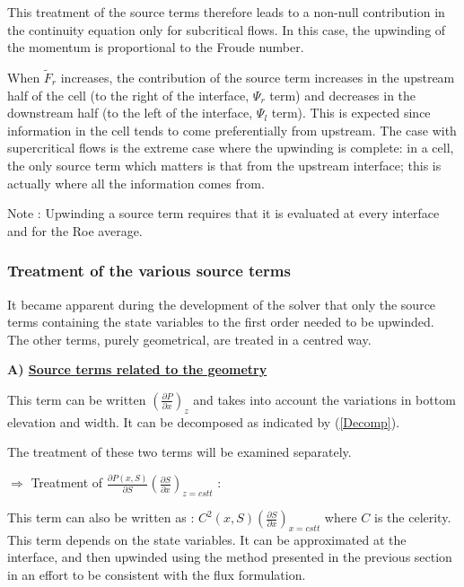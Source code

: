 This treatment of the source terms therefore leads to a non-null contribution in the continuity equation only for subcritical flows. In this case, the upwinding of the momentum is proportional to the Froude number.

When $\tilde{F}_r$ increases, the contribution of the source term increases in the upstream half of the cell (to the right of the interface, $\Psi_r$ term) and decreases in the downstream half (to the left of the interface, $\Psi_l$ term). This is expected since information in the cell tends to come preferentially from upstream. The case with supercritical flows is the extreme case where the upwinding is complete: in a cell, the only source term which matters is that from the upstream interface; this is actually where all the information comes from.

\begin{CommentBlock}{Note :}
Upwinding a source term requires that it is evaluated at every interface and for the Roe average.
\end{CommentBlock}

\subsubsection{Treatment of the various source terms}

It became apparent during the development of the solver that only the source terms containing the state variables to the first order needed to be upwinded. The other terms, purely geometrical, are treated in a centred way.

\textbf{A) \underline{Source terms related to the geometry}}

This term can be written  $\left ( \frac{\partial P}{\partial x}\right )_z$ and takes into account the variations in bottom elevation and width. It can be decomposed as indicated by (\ref{Decomp}).

The treatment of these two terms will be examined separately.

$\Longrightarrow$ Treatment of $\frac{\partial P(x,S)}{\partial S}\left ( \frac{\partial S}{\partial x}\right )_{z=cstt}$ :

This term can also be written as : $C^2 (x,S)\left ( \frac{\partial S}{\partial x}\right )_{x=cstt}$ where $C$ is the celerity. This term depends on the state variables. It can be approximated at the interface, and then upwinded using the method presented in the previous section in an effort to be consistent with the flux formulation.

